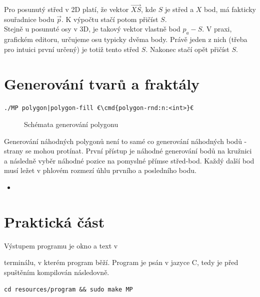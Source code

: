 \documentclass[a4paper,12pt]{book}
\newcommand{\cmd}[1]{\textcolor{blue}{\textbf{#1}}}
\begin{document}
Pro posunutý střed v 2D platí, že vektor $\vec{XS}$, kde $S$ je střed a $X$ bod, má fakticky souřadnice bodu $\vec{p}$. K výpočtu stačí potom přičíst $S$.\\

Stejně u posunuté osy v 3D, je takový vektor vlastně bod $p_a-S$.
V praxi, grafickém editoru, určujeme osu typicky dvěma body. Právě jeden z nich (třeba pro intuici první určený) je totiž tento střed $S$. Nakonec stačí opět přičíst $S$.









\chapter{Generování tvarů a fraktály}

\begin{lstlisting}[emph={:}]
./MP polygon|polygon-fill €\cmd{polygon-rnd:n:<int>}€
\end{lstlisting}

\begin{figure}[H]
  \centering
  \subfigure[]{}
  \hfill
  \subfigure[]{}
    \hfill
  \subfigure[]{}
  \caption{Schémata generování polygonu}
  \centering
\end{figure}
 
Generování náhodných polygonů není to samé co generování náhodných bodů - strany se mohou protínat.
První přístup je náhodné generování bodů na kružnici a následně vyběr náhodné pozice na pomyslné přímse střed-bod.
Každý další bod musí ležet v phlovém rozmezí úhlu prvního a posledního bodu.



\begin{itemize}
  \item 
\end{itemize}



\chapter{Praktická část}

Výstupem programu je okno a text v 

terminálu, v kterém program běží.
Program je psán v jazyce C, tedy je před spuštěním kompilován následovně.
\begin{lstlisting}
cd resources/program && sudo make MP
\end{lstlisting}
\end{document}
